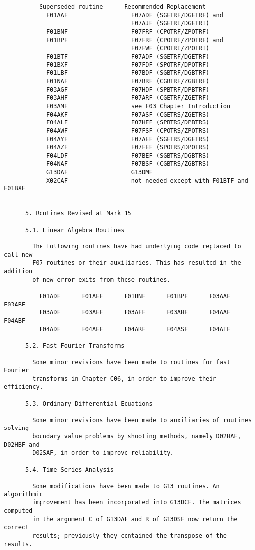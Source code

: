 \begin{small}
\begin{verbatim}
          Superseded routine      Recommended Replacement
            F01AAF                  F07ADF (SGETRF/DGETRF) and
                                    F07AJF (SGETRI/DGETRI)
            F01BNF                  F07FRF (CPOTRF/ZPOTRF)
            F01BPF                  F07FRF (CPOTRF/ZPOTRF) and
                                    F07FWF (CPOTRI/ZPOTRI)
            F01BTF                  F07ADF (SGETRF/DGETRF)
            F01BXF                  F07FDF (SPOTRF/DPOTRF)
            F01LBF                  F07BDF (SGBTRF/DGBTRF)
            F01NAF                  F07BRF (CGBTRF/ZGBTRF)
            F03AGF                  F07HDF (SPBTRF/DPBTRF)
            F03AHF                  F07ARF (CGETRF/ZGETRF)
            F03AMF                  see F03 Chapter Introduction
            F04AKF                  F07ASF (CGETRS/ZGETRS)
            F04ALF                  F07HEF (SPBTRS/DPBTRS)
            F04AWF                  F07FSF (CPOTRS/ZPOTRS)
            F04AYF                  F07AEF (SGETRS/DGETRS)
            F04AZF                  F07FEF (SPOTRS/DPOTRS)
            F04LDF                  F07BEF (SGBTRS/DGBTRS)
            F04NAF                  F07BSF (CGBTRS/ZGBTRS)
            G13DAF                  G13DMF
            X02CAF                  not needed except with F01BTF and F01BXF


      5. Routines Revised at Mark 15

      5.1. Linear Algebra Routines

        The following routines have had underlying code replaced to call new
        F07 routines or their auxiliaries. This has resulted in the addition
        of new error exits from these routines.

          F01ADF      F01AEF      F01BNF      F01BPF      F03AAF      F03ABF
          F03ADF      F03AEF      F03AFF      F03AHF      F04AAF      F04ABF
          F04ADF      F04AEF      F04ARF      F04ASF      F04ATF

      5.2. Fast Fourier Transforms

        Some minor revisions have been made to routines for fast Fourier
        transforms in Chapter C06, in order to improve their efficiency.

      5.3. Ordinary Differential Equations

        Some minor revisions have been made to auxiliaries of routines solving
        boundary value problems by shooting methods, namely D02HAF, D02HBF and
        D02SAF, in order to improve reliability.

      5.4. Time Series Analysis

        Some modifications have been made to G13 routines. An algorithmic
        improvement has been incorporated into G13DCF. The matrices computed
        in the argument C of G13DAF and R of G13DSF now return the correct
        results; previously they contained the transpose of the results.
\end{verbatim}
\end{small}


